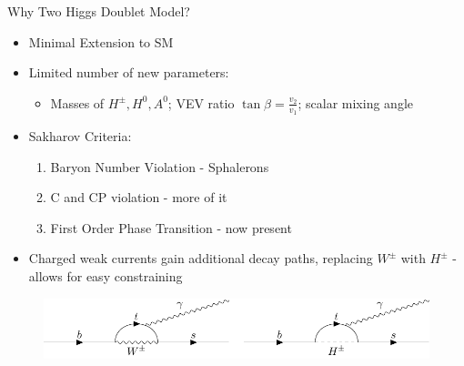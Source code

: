 \documentclass[10pt,xcolor={table,dvipsnames},t]{beamer}
\begin{document}
\begin{frame}{Why Two Higgs Doublet Model?}
    \begin{itemize}
        \item Minimal Extension to SM
        \item Limited number of new parameters:
            \begin{itemize}
                \item Masses of $H^\pm,H^0,A^0$; VEV ratio $\tan\beta=\frac{v_2}{v_1}$; scalar mixing angle
            \end{itemize}
        \item Sakharov Criteria:
            \begin{enumerate}
                \item Baryon Number Violation - Sphalerons
                \item C and CP violation - more of it
                \item First Order Phase Transition - now present
            \end{enumerate}
        \item Charged weak currents gain additional decay paths, replacing $W^\pm$ with $H^\pm$ - allows for easy constraining
    \end{itemize}
    \begin{figure}[H]
        \centering
        \includegraphics[scale=0.6]{../presentation/fine1.pdf}
    \end{figure}
\end{frame}
\end{document}

